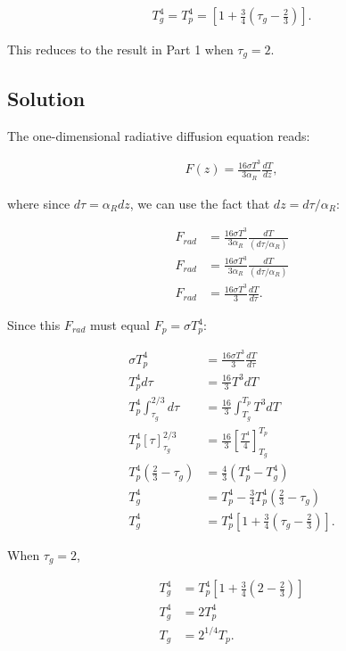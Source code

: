 \documentclass[12pt]{article}
\begin{document}
\begin{align*}
T_g^4 = T_p^4 = \left[ 1 + \frac{3}{4} \left( \tau_g - \frac{2}{3} \right) \right].
\end{align*}

This reduces to the result in Part 1 when $\tau_g = 2.$

\subsection*{Solution}

The one-dimensional radiative diffusion equation reads:

\begin{align*}
F(z) = \frac{16\sigma T^3}{3\alpha_R}\frac{dT}{dz},
\end{align*}

where since $d\tau = \alpha_Rdz$, we can use the fact that $dz = d\tau/\alpha_R$:

\begin{equation*}
\begin{split}
F_{rad} &= \frac{16\sigma T^3}{3\alpha_R}\frac{dT}{(d\tau/\alpha_R)}\\
F_{rad} &= \frac{16\sigma T^3}{3\alpha_R}\frac{dT}{(d\tau/\alpha_R)}\\
F_{rad} &= \frac{16\sigma T^3}{3}\frac{dT}{d\tau}.
\end{split}
\end{equation*}

Since this $F_{rad}$ must equal $F_p = \sigma T_p^4$:

\begin{equation*}
\begin{split}
\sigma T_p^4 &= \frac{16\sigma T^3}{3}\frac{dT}{d\tau}\\
T_p^4d\tau &= \frac{16}{3}T^3dT\\
T_p^4\int_{\tau_g}^{2/3}d\tau &= \frac{16}{3}\int_{T_g}^{T_p}T^3dT\\
T_p^4[\tau]_{\tau_g}^{2/3} &= \frac{16}{3}\left[\frac{T^4}{4}\right]_{T_g}^{T_p}\\
T_p^4(\frac{2}{3} - \tau_g) &= \frac{4}{3}(T_p^4 - T_g^4)\\
T_g^4 &= T_p^4 - \frac{3}{4}T_p^4(\frac{2}{3} - \tau_g)\\
T_g^4 &= T_p^4\left[1 + \frac{3}{4}(\tau_g - \frac{2}{3})\right].
\end{split}
\end{equation*}

When $\tau_g = 2$,

\begin{equation*}
\begin{split}
T_g^4 &= T_p^4\left[1 + \frac{3}{4}(2 - \frac{2}{3})\right]\\
T_g^4 &= 2T_p^4\\
T_g &= 2^{1/4}T_p.
\end{split}
\end{equation*}
\end{document}
